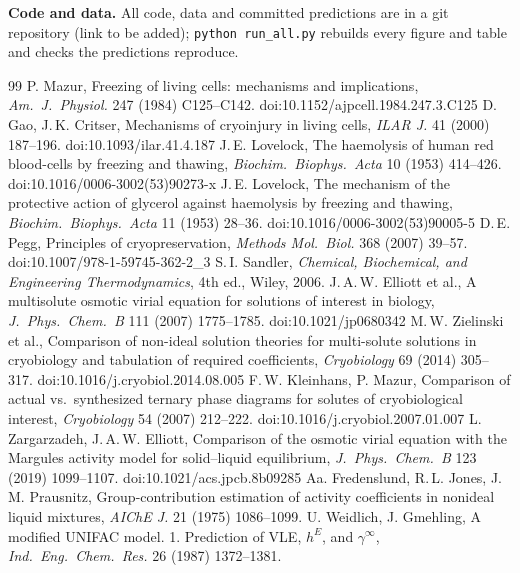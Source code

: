 \documentclass[10pt,a4paper]{article}
\begin{document}
\textbf{Code and data.} All code, data and committed predictions are in a git repository (link to be added);
\texttt{python run\_all.py} rebuilds every figure and table and checks the predictions reproduce.

\renewcommand{\refname}{\normalsize\bfseries\scshape References}
\begin{thebibliography}{99}
\footnotesize
\setlength{\itemsep}{0pt}\setlength{\parsep}{0pt}
 P. Mazur, Freezing of living cells: mechanisms and implications, \emph{Am.\ J.\ Physiol.} 247 (1984) C125--C142. doi:10.1152/ajpcell.1984.247.3.C125
 D. Gao, J.\,K. Critser, Mechanisms of cryoinjury in living cells, \emph{ILAR J.} 41 (2000) 187--196. doi:10.1093/ilar.41.4.187
 J.\,E. Lovelock, The haemolysis of human red blood-cells by freezing and thawing, \emph{Biochim.\ Biophys.\ Acta} 10 (1953) 414--426. doi:10.1016/0006-3002(53)90273-x
 J.\,E. Lovelock, The mechanism of the protective action of glycerol against haemolysis by freezing and thawing, \emph{Biochim.\ Biophys.\ Acta} 11 (1953) 28--36. doi:10.1016/0006-3002(53)90005-5
 D.\,E. Pegg, Principles of cryopreservation, \emph{Methods Mol.\ Biol.} 368 (2007) 39--57. doi:10.1007/978-1-59745-362-2\_3
 S.\,I. Sandler, \emph{Chemical, Biochemical, and Engineering Thermodynamics}, 4th ed., Wiley, 2006.
 J.\,A.\,W. Elliott et al., A multisolute osmotic virial equation for solutions of interest in biology, \emph{J.\ Phys.\ Chem.\ B} 111 (2007) 1775--1785. doi:10.1021/jp0680342
 M.\,W. Zielinski et al., Comparison of non-ideal solution theories for multi-solute solutions in cryobiology and tabulation of required coefficients, \emph{Cryobiology} 69 (2014) 305--317. doi:10.1016/j.cryobiol.2014.08.005
 F.\,W. Kleinhans, P. Mazur, Comparison of actual vs.\ synthesized ternary phase diagrams for solutes of cryobiological interest, \emph{Cryobiology} 54 (2007) 212--222. doi:10.1016/j.cryobiol.2007.01.007
 L. Zargarzadeh, J.\,A.\,W. Elliott, Comparison of the osmotic virial equation with the Margules activity model for solid--liquid equilibrium, \emph{J.\ Phys.\ Chem.\ B} 123 (2019) 1099--1107. doi:10.1021/acs.jpcb.8b09285
 Aa. Fredenslund, R.\,L. Jones, J.\,M. Prausnitz, Group-contribution estimation of activity coefficients in nonideal liquid mixtures, \emph{AIChE J.} 21 (1975) 1086--1099.
 U. Weidlich, J. Gmehling, A modified UNIFAC model. 1. Prediction of VLE, $h^E$, and $\gamma^\infty$, \emph{Ind.\ Eng.\ Chem.\ Res.} 26 (1987) 1372--1381.

\end{thebibliography}
\end{document}
